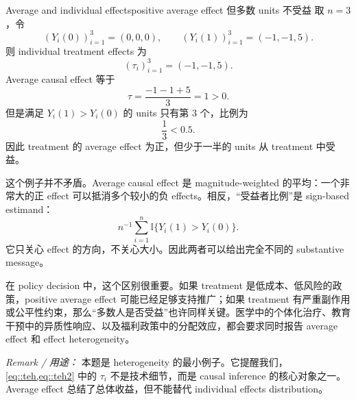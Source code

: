 \begin{exercisesolution}{Average and individual effects}{positive average effect 但多数 units 不受益}
取 $n=3$，令
\[
(Y_i(0))_{i=1}^3=(0,0,0),\qquad
(Y_i(1))_{i=1}^3=(-1,-1,5).
\]
则 individual treatment effects 为
\[
(\tau_i)_{i=1}^3=(-1,-1,5).
\]
Average causal effect 等于
\[
\tau=\frac{-1-1+5}{3}=1>0.
\]
但是满足 $Y_i(1)>Y_i(0)$ 的 units 只有第 $3$ 个，比例为
\[
\frac{1}{3}<0.5.
\]
因此 treatment 的 average effect 为正，但少于一半的 units 从 treatment 中受益。

这个例子并不矛盾。Average causal effect 是 magnitude-weighted 的平均：一个非常大的正 effect 可以抵消多个较小的负 effects。相反，“受益者比例”是 sign-based estimand：
\[
n^{-1}\sum_{i=1}^n \mathbb{I}\{Y_i(1)>Y_i(0)\}.
\]
它只关心 effect 的方向，不关心大小。因此两者可以给出完全不同的 substantive message。

在 policy decision 中，这个区别很重要。如果 treatment 是低成本、低风险的政策，positive average effect 可能已经足够支持推广；如果 treatment 有严重副作用或公平性约束，那么“多数人是否受益”也许同样关键。医学中的个体化治疗、教育干预中的异质性响应、以及福利政策中的分配效应，都会要求同时报告 average effect 和 effect heterogeneity。

\emph{Remark / 用途：} 本题是 heterogeneity 的最小例子。它提醒我们，\cref{eq::teh,eq::teh2} 中的 $\tau_i$ 不是技术细节，而是 causal inference 的核心对象之一。Average effect 总结了总体收益，但不能替代 individual effects distribution。
\end{exercisesolution}
